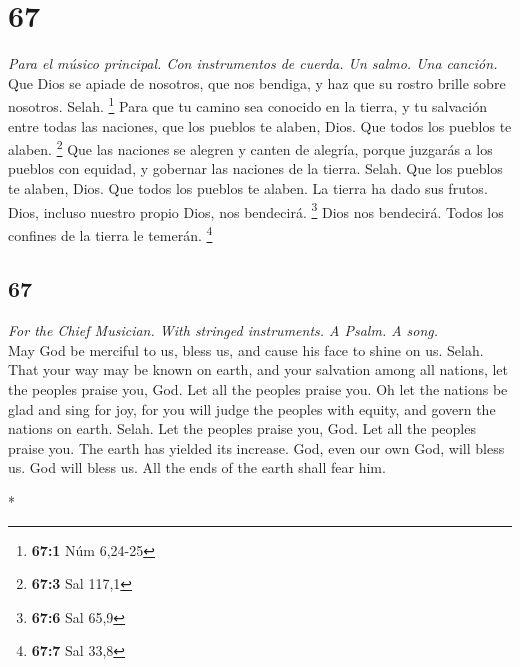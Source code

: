 \begin{paracol}{2}
\hypertarget{section-132}{%
\section{67}\label{section-132}}

\emph{Para el músico principal. Con instrumentos de cuerda. Un salmo.
Una canción.}\\
 Que Dios se apiade de nosotros, que nos bendiga, y haz
que su rostro brille sobre nosotros. Selah. \footnote{\textbf{67:1} Núm
  6,24-25}  Para que tu camino sea conocido en la tierra,
y tu salvación entre todas las naciones,  que los pueblos
te alaben, Dios. Que todos los pueblos te alaben. \footnote{\textbf{67:3}
  Sal 117,1}  Que las naciones se alegren y canten de
alegría, porque juzgarás a los pueblos con equidad, y gobernar las
naciones de la tierra. Selah.  Que los pueblos te alaben,
Dios. Que todos los pueblos te alaben.  La tierra ha dado
sus frutos. Dios, incluso nuestro propio Dios, nos bendecirá.
\footnote{\textbf{67:6} Sal 65,9}  Dios nos bendecirá.
Todos los confines de la tierra le temerán. \footnote{\textbf{67:7} Sal
  33,8}

\switchcolumn
\begin{otherlanguage}{english}

\hypertarget{section-133}{%
\section{67}\label{section-133}}

\emph{For the Chief Musician. With stringed instruments. A Psalm. A
song.}\\
 May God be merciful to us, bless us, and cause his face
to shine on us. Selah.  That your way may be known on
earth, and your salvation among all nations,  let the
peoples praise you, God. Let all the peoples praise you. 
Oh let the nations be glad and sing for joy, for you will judge the
peoples with equity, and govern the nations on earth. Selah.
 Let the peoples praise you, God. Let all the peoples
praise you.  The earth has yielded its increase. God, even
our own God, will bless us.  God will bless us. All the
ends of the earth shall fear him.

\end{otherlanguage}

\switchcolumn[0]*


\end{paracol}
